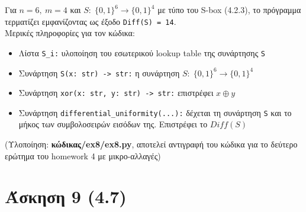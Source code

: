 \documentclass[12pt]{article}
\newcommand{\lt}{\latintext}
\newcommand{\xor}{\ensuremath{\oplus}}
\begin{document}
\noindent
Για $n=6,\: m = 4$ και $S:\;\{0, 1\}^6 \rightarrow \{0, 1\}^4$ 
με τύπο του {\lt S-box (4.2.3)}, το πρόγραμμα τερματίζει 
εμφανίζοντας ως έξοδο \texttt{\lt Diff(S) = 14}.\\

\noindent
Μερικές πληροφορίες για τον κώδικα:
\begin{itemize}
	\item Λίστα \texttt{\lt S\_i:} υλοποίηση του εσωτερικού 
	{\lt lookup table} της συνάρτησης \texttt{\lt S}
	\item Συνάρτηση  \texttt{\lt S(x: str) -> str:} η 
	συνάρτηση $S:\;\{0, 1\}^6 \rightarrow \{0, 1\}^4$
	\item Συνάρτηση  \texttt{\lt xor(x: str, y: str) -> str:} 
	επιστρέφει $x \xor y$
	\item Συνάρτηση 
	\texttt{\lt differential\_uniformity(...):} 
	δέχεται τη συνάρτηση \texttt{\lt S} και το μήκος 
	των συμβολοσειρών εισόδων της. Επιστρέφει το $Diff(S)$
\end{itemize}

\vspace{0.1in}
\noindent
(Υλοποίηση: \textbf{κώδικας/{\lt ex8/ex8.py}}, αποτελεί αντιγραφή του κώδικα για το δεύτερο ερώτημα του 
{\lt homework 4} με μικρο-αλλαγές)

\pagebreak

\section*{Άσκηση 9 (4.7)}
\end{document}
